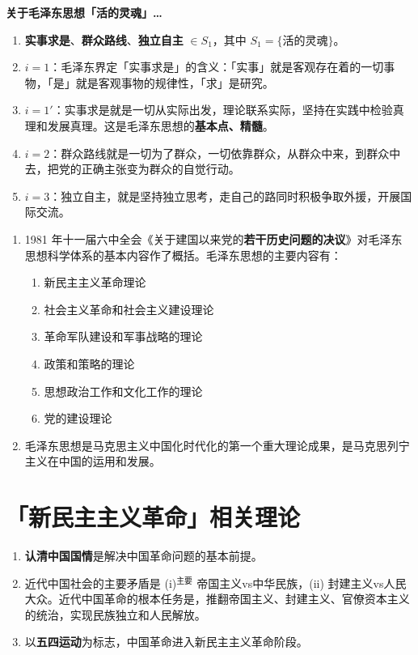 \documentclass[UTF8]{ctexart}
\newcommand\Emph[2]{\colorbox{c#1-light}{\textcolor{c#1-emph}{\textbf{#2}}}}
\begin{document}
\begin{mybox}{1}
\textbf{关于毛泽东思想「活的灵魂」…}
\begin{enumerate}
  \item \Emph{1}{实事求是}、\Emph{1}{群众路线}、\Emph{1}{独立自主} $\in S_1$，其中 $S_1=\{\text{活的灵魂}\}$。
  \item $i=1$：毛泽东界定「实事求是」的含义：「实事」就是客观存在着的一切事物，「是」就是客观事物的规律性，「求」是研究。
  \item $i=1'$：实事求是就是一切从实际出发，理论联系实际，坚持在实践中检验真理和发展真理。这是毛泽东思想的\Emph{1}{基本点、精髓}。
  \item $i=2$：群众路线就是一切为了群众，一切依靠群众，从群众中来，到群众中去，把党的正确主张变为群众的自觉行动。
  \item $i=3$：独立自主，就是坚持独立思考，走自己的路同时积极争取外援，开展国际交流。
\end{enumerate}
\end{mybox}

\begin{enumerate}[start=16]
  \item 1981 年十一届六中全会《关于建国以来党的\Emph{1}{若干历史问题的决议}》对毛泽东思想科学体系的基本内容作了概括。毛泽东思想的主要内容有：
  \begin{enumerate}[label={\roman{enumii})}, start=1]
    \item 新民主主义革命理论
    \item 社会主义革命和社会主义建设理论
    \item 革命军队建设和军事战略的理论
    \item 政策和策略的理论
    \item 思想政治工作和文化工作的理论
    \item 党的建设理论
  \end{enumerate}
  \item 毛泽东思想是马克思主义中国化时代化的第一个重大理论成果，是马克思列宁主义在中国的运用和发展。
\end{enumerate}

\newpage
{}
\BgThispage
\pagecolor{c2-med}
\section{「新民主主义革命」相关理论}\label{sec:2}
\begin{enumerate}[start=1]
  \item \Emph{2}{认清中国国情}是解决中国革命问题的基本前提。
  \item 近代中国社会的主要矛盾是 (i)$^{\text{主要}}$ 帝国主义vs中华民族，(ii) 封建主义vs人民大众。近代中国革命的根本任务是，推翻帝国主义、封建主义、官僚资本主义的统治，实现民族独立和人民解放。
  \item 以\Emph{2}{五四运动}为标志，中国革命进入新民主主义革命阶段。
\end{enumerate}
\end{document}
